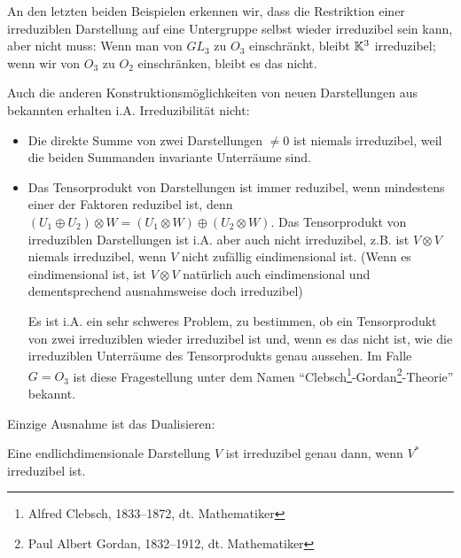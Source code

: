 \begin{remark}
An den letzten beiden Beispielen erkennen wir, dass die Restriktion einer irreduziblen Darstellung auf eine Untergruppe selbst wieder irreduzibel sein kann, aber nicht muss: Wenn man von $GL_3$ zu $O_3$ einschränkt, bleibt $\mathbb{K}^3$ irreduzibel; wenn wir von $O_3$ zu $O_2$ einschränken, bleibt es das nicht.

Auch die anderen Konstruktionsmöglichkeiten von neuen Darstellungen aus bekannten erhalten i.A. Irreduzibilität nicht:
\begin{itemize}
\item Die direkte Summe von zwei Darstellungen $\neq 0$ ist niemals irreduzibel, weil die beiden Summanden invariante Unterräume sind.
\item Das Tensorprodukt von Darstellungen ist immer reduzibel, wenn mindestens einer der Faktoren reduzibel ist, denn $(U_1\oplus U_2)\otimes W = (U_1\otimes W) \oplus (U_2\otimes W)$. Das Tensorprodukt von irreduziblen Darstellungen ist i.A. aber auch nicht irreduzibel, z.B. ist $V\otimes V$ niemals irreduzibel, wenn $V$ nicht zufällig eindimensional ist. (Wenn es eindimensional ist, ist $V\otimes V$ natürlich auch eindimensional und dementsprechend ausnahmsweise doch irreduzibel)

Es ist i.A. ein sehr schweres Problem, zu bestimmen, ob ein Tensorprodukt von zwei irreduziblen wieder irreduzibel ist und, wenn es das nicht ist, wie die irreduziblen Unterräume des Tensorprodukts genau aussehen. Im Falle $G=O_3$ ist diese Fragestellung unter dem Namen \enquote{Clebsch\footnote{Alfred Clebsch, 1833--1872, dt. Mathematiker}-Gordan\footnote{Paul Albert Gordan, 1832--1912, dt. Mathematiker}-Theorie} bekannt.
\end{itemize}

Einzige Ausnahme ist das Dualisieren:
\end{remark}

\begin{lemma}
Eine endlichdimensionale Darstellung $V$ ist irreduzibel genau dann, wenn $V^\ast$ irreduzibel ist.
\end{lemma}